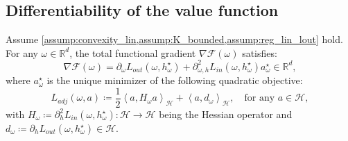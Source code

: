 \subsection{Differentiability of the value function}
\begin{proposition}\label{prop:tot_grad_int}
Assume \cref{assump:convexity_lin,assump:K_bounded,assump:reg_lin_lout} hold. For any $\omega\in{\mathbb{R}^d}$, the total functional gradient $\nabla\mathcal{F}(\omega)$ satisfies:
\begin{equation}\label{eq:tot_grad}
    \nabla\mathcal{F}(\omega)=\partial_\omega L_{out}(\omega, h^\star_\omega)+\partial_{\omega,h}^2 L_{in}(\omega, h^\star_\omega)a^\star_\omega\in{\mathbb{R}^d},
\end{equation}
where $a^\star_\omega$ 
is the unique minimizer of the following quadratic objective:
\begin{equation}\label{eq:ladj}
    L_{adj}(\omega,a)\coloneqq\frac{1}{2}\left\langle a, H_{\omega}a\right\rangle_\mathcal{H}+\left\langle a, d_\omega\right\rangle_\mathcal{H},\quad\text{for any }a\in\mathcal{H},
\end{equation}
with $H_{\omega}\coloneqq\partial_h^2 L_{in}(\omega, h^\star_\omega):\mathcal{H}\to\mathcal{H}$ being the Hessian operator and $d_\omega\coloneqq\partial_h L_{out}(\omega, h^\star_\omega)\in\mathcal{H}$.
\end{proposition}
